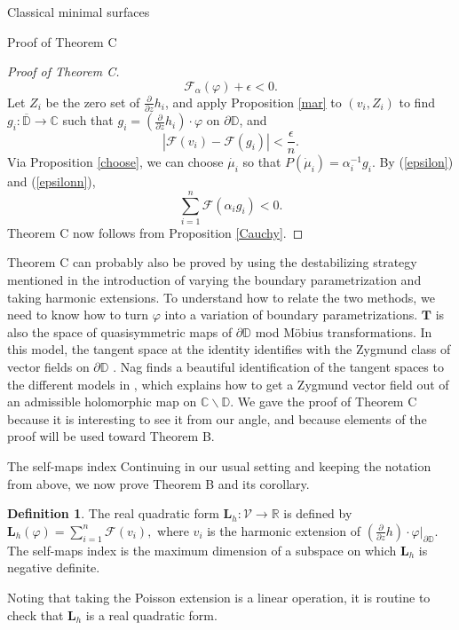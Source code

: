 \documentclass[10pt]{amsart}
\newcommand{\R}{\mathbb R}
\theoremstyle{definition}
\newtheorem{defn}[thm]{Definition}
\begin{document}
\begin{section}{Classical minimal surfaces}
\begin{subsection}{Proof of Theorem C}
\begin{proof}[Proof of Theorem C]
\begin{equation}\label{epsilon}
    \mathcal{F}_{\alpha}(\varphi)+\epsilon<0.
\end{equation}
Let $Z_i$ be the zero set of $\frac{\partial}{\partial z} h_i$, and apply Proposition \ref{mar} to $(v_i,Z_i)$ 
to find $g_i:\overline{\mathbb{D}}\to\mathbb{C}$ such that $g_i=(\frac{\partial}{\partial z} h_i)\cdot \varphi$ on $\partial\mathbb{D}$, and  
\begin{equation}\label{epsilonn}
    |\mathcal{F}(v_i)-\mathcal{F}(g_i)|<\frac{\epsilon}{n}.
\end{equation}
Via Proposition \ref{choose}, we can choose $\dot{\mu_i}$ so that $P(\dot{\mu}_i)=\alpha_i^{-1}g_i$. By (\ref{epsilon}) and (\ref{epsilonn}), $$\sum_{i=1}^n \mathcal{F}(\alpha_ig_i)<0.$$ Theorem C now follows from Proposition \ref{Cauchy}.
\end{proof}

    Theorem C can probably also be proved by using the destabilizing strategy mentioned in the introduction of varying the boundary parametrization and taking harmonic extensions. To understand how to relate the two methods, we need to know how to turn $\varphi$ into a variation of boundary parametrizations. $\mathbf{T}$ is also the space of quasisymmetric maps of $\partial\mathbb{D}$ mod M{\"o}bius transformations. In this model, the tangent space at the identity identifies with the Zygmund class of vector fields on $\partial\mathbb{D}$ \cite[Section 2]{Nag}. Nag finds a beautiful identification of the tangent spaces to the different models in \cite[Section 3]{Nag}, which explains how to get a Zygmund vector field out of an admissible holomorphic map on $\mathbb{C}\backslash\mathbb{D}.$ We gave the proof of Theorem C because it is interesting to see it from our angle, and because elements of the proof will be used toward Theorem B.
\end{subsection}

\begin{subsection}{The self-maps index}\label{selfmapss}
Continuing in our usual setting and keeping the notation from above, we now prove Theorem B and its corollary.
\begin{defn}
    The real quadratic form $\mathbf{L}_h : \mathcal{V} \to \R$ is defined by $\mathbf{L}_h(\varphi)= \sum_{i=1}^n \mathcal{F}(v_i),$ where $v_i$ is the harmonic extension of $(\frac{\partial}{\partial z} h)\cdot \varphi|_{\partial\mathbb{D}}.$ The self-maps index is the maximum dimension of a subspace on which $\mathbf{L}_h$ is negative definite.
\end{defn}
Noting that taking the Poisson extension is a linear operation, it is routine to check that $\mathbf{L}_h$ is a real quadratic form.
 

\end{subsection}
\end{section}
\end{document}
